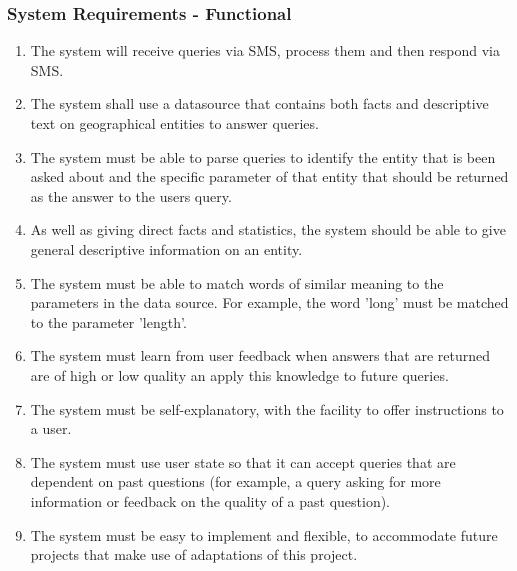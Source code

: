 \documentclass{article}
\begin{document}
\subsubsection{System Requirements - Functional}
\begin{enumerate}
  \item The system will receive queries via SMS, process them and then respond via SMS.
  \item The system shall use a datasource that contains both facts and descriptive text on geographical entities to answer queries.
  \item The system must be able to parse queries to identify the entity that is been asked about and the specific parameter of that entity that should be returned as the answer to the users query.
  \item As well as giving direct facts and statistics, the system should be able to give general descriptive information on an entity.
  \item The system must be able to match words of similar meaning to the parameters in the data source.  For example, the word 'long' must be matched to the parameter 'length'.
  \item The system must learn from user feedback when answers that are returned are of high or low quality an apply this knowledge to future queries.
  \item The system must be self-explanatory, with the facility to offer instructions to a user.
  \item The system must use user state so that it can accept queries that are dependent on past questions (for example, a query asking for more information or feedback on the quality of a past question).
  \item The system must be easy to implement and flexible, to accommodate future projects that make use of adaptations of this project.
\end{enumerate}
\end{document}
